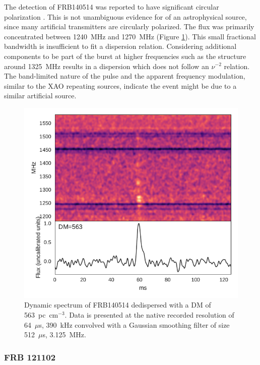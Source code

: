 \documentclass[a4paper,fleqn,usenatbib]{mnras}
\begin{document}
The detection of FRB140514 was reported to have significant circular
polarization \citep{2015MNRAS.447..246P}.  This is not unambiguous evidence for
of an astrophysical source, since many artificial transmitters are circularly
polarized.  The flux was primarily concentrated between 1240~MHz and 1270~MHz
(Figure \ref{fig:FRB140514}). This small fractional bandwidth is insufficient to
fit a dispersion relation. Considering additional components to be part of the
burst at higher frequencies such as the structure around 1325~MHz results in a
dispersion which does not follow an $\nu^{-2}$ relation. The band-limited nature
of the pulse and the apparent frequency modulation, similar to the XAO repeating
sources, indicate the event might be due to a similar artificial source. 


\begin{figure}
    \includegraphics[width=1.0\linewidth]{figures/FRB140514.pdf}
    \caption{Dynamic spectrum of FRB140514 dedispersed with a DM of
    563~pc~cm$^{-3}$.  Data is presented at the native recorded resolution of
    64~$\mu$s, 390~kHz convolved with a Gaussian smoothing filter of size
    512~$\mu$s, 3.125~MHz.
    }
    \label{fig:FRB140514}
\end{figure}

\subsubsection{FRB 121102}
\end{document}
